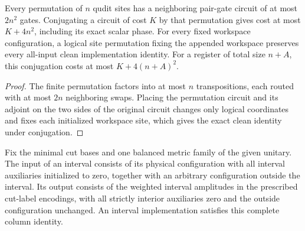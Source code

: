 \begin{lemma}
    \label{thm:mpu_quantitative_site_permutation}
    \leanok
    Every permutation of $n$ qudit sites has a neighboring
    pair-gate circuit of at most $2n^2$ gates. Conjugating a circuit
    of cost $K$ by that permutation gives cost at most $K+4n^2$,
    including its exact scalar phase. For every fixed workspace configuration,
    a logical site permutation fixing the appended workspace preserves
    every all-input clean implementation identity. For a register of total size $n+A$,
    this conjugation costs at most $K+4(n+A)^2$.
\end{lemma}
\begin{proof}\leanok
    The finite permutation factors into at most $n$ transpositions,
    each routed with at most $2n$ neighboring swaps. Placing the
    permutation circuit and its adjoint on the two sides of the
    original circuit changes only logical
    coordinates and fixes each initialized workspace site, which
    gives the exact clean identity under conjugation.
\end{proof}

\begin{definition}
    \label{def:mpu_actual_interval_columns}
    \leanok
    Fix the minimal cut bases and one balanced metric family of the
    given unitary. The input of an interval consists of its physical
    configuration with all interval auxiliaries initialized to zero,
    together with an arbitrary configuration outside the interval.
    Its output consists of the weighted interval amplitudes in the
    prescribed cut-label encodings, with all strictly interior
    auxiliaries zero and the outside configuration unchanged.
    An interval implementation satisfies this complete column identity.
\end{definition}

